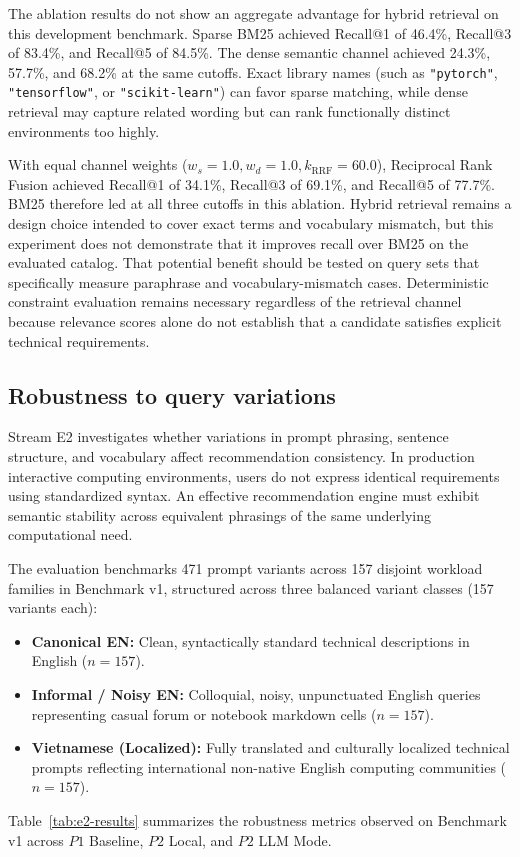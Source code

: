 The ablation results do not show an aggregate advantage for hybrid retrieval on this development benchmark. Sparse BM25 achieved Recall@1 of 46.4\%, Recall@3 of 83.4\%, and Recall@5 of 84.5\%. The dense semantic channel achieved 24.3\%, 57.7\%, and 68.2\% at the same cutoffs. Exact library names (such as \texttt{"pytorch"}, \texttt{"tensorflow"}, or \texttt{"scikit-learn"}) can favor sparse matching, while dense retrieval may capture related wording but can rank functionally distinct environments too highly.

With equal channel weights ($w_s = 1.0, w_d = 1.0, k_{\mathrm{RRF}} = 60.0$), Reciprocal Rank Fusion achieved Recall@1 of 34.1\%, Recall@3 of 69.1\%, and Recall@5 of 77.7\%. BM25 therefore led at all three cutoffs in this ablation. Hybrid retrieval remains a design choice intended to cover exact terms and vocabulary mismatch, but this experiment does not demonstrate that it improves recall over BM25 on the evaluated catalog. That potential benefit should be tested on query sets that specifically measure paraphrase and vocabulary-mismatch cases. Deterministic constraint evaluation remains necessary regardless of the retrieval channel because relevance scores alone do not establish that a candidate satisfies explicit technical requirements.

\subsection{Robustness to query variations}
\label{subsec:e2_robustness}

Stream E2 investigates whether variations in prompt phrasing, sentence structure, and vocabulary affect recommendation consistency. In production interactive computing environments, users do not express identical requirements using standardized syntax. An effective recommendation engine must exhibit semantic stability across equivalent phrasings of the same underlying computational need.

The evaluation benchmarks 471 prompt variants across 157 disjoint workload families in Benchmark v1, structured across three balanced variant classes (157 variants each):
\begin{itemize}
    \item \textbf{Canonical EN:} Clean, syntactically standard technical descriptions in English ($n=157$).
    \item \textbf{Informal / Noisy EN:} Colloquial, noisy, unpunctuated English queries representing casual forum or notebook markdown cells ($n=157$).
    \item \textbf{Vietnamese (Localized):} Fully translated and culturally localized technical prompts reflecting international non-native English computing communities ($n=157$).
\end{itemize}
Table~\ref{tab:e2-results} summarizes the robustness metrics observed on Benchmark v1 across $P1$ Baseline, $P2$ Local, and $P2$ LLM Mode.

